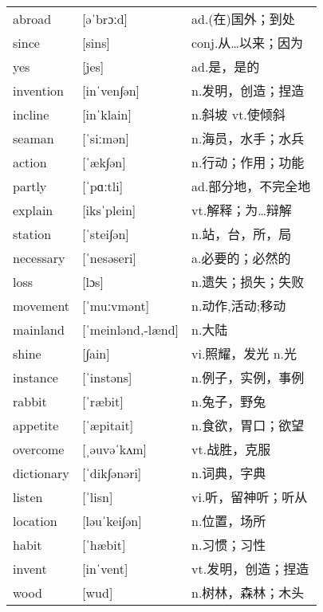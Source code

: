\documentclass[a4paper]{article}
\begin{document}
\section{}
\begin{tabular}{l l l}

abroad & [əˈbrɔːd] & ad.(在)国外；到处 \\
since & [sins] & conj.从…以来；因为 \\
yes & [jes] & ad.是，是的 \\
invention & [inˈven∫ən] & n.发明，创造；捏造 \\
incline & [inˈklain] & n.斜坡 vt.使倾斜 \\
seaman & [ˈsiːmən] & n.海员，水手；水兵 \\
action & [ˈæk∫ən] & n.行动；作用；功能 \\
partly & [ˈpɑːtli] & ad.部分地，不完全地 \\
explain & [iksˈplein] & vt.解释；为…辩解 \\
station & [ˈstei∫ən] & n.站，台，所，局 \\
necessary & [ˈnesəseri] & a.必要的；必然的 \\
loss & [lɔs] & n.遗失；损失；失败 \\
movement & [ˈmuːvmənt] & n.动作,活动;移动 \\
mainland & [ˈmeinlənd,-lænd] & n.大陆 \\
shine & [∫ain] & vi.照耀，发光 n.光 \\
instance & [ˈinstəns] & n.例子，实例，事例 \\
rabbit & [ˈræbit] & n.兔子，野兔 \\
appetite & [ˈæpitait] & n.食欲，胃口；欲望 \\
overcome & [ˌəuvəˈkʌm] & vt.战胜，克服 \\
dictionary & [ˈdik∫ənəri] & n.词典，字典 \\
listen & [ˈlisn] & vi.听，留神听；听从 \\
location & [ləuˈkei∫ən] & n.位置，场所 \\
habit & [ˈhæbit] & n.习惯；习性 \\
invent & [inˈvent] & vt.发明，创造；捏造 \\
wood & [wud] & n.树林，森林；木头 \\

\end{tabular}
\end{document}
